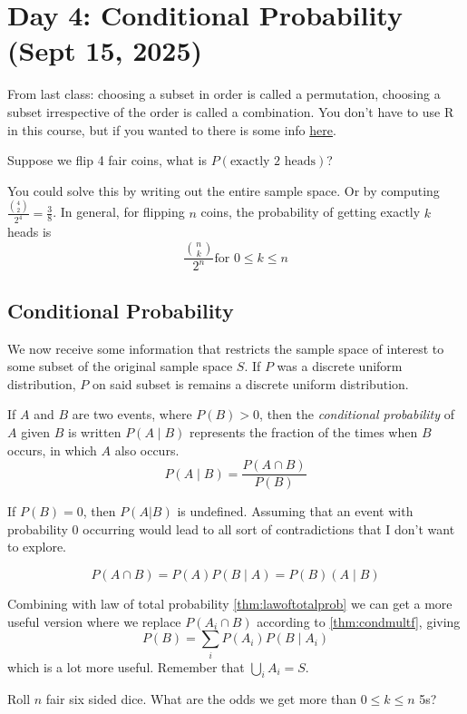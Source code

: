 \section{Day 4: Conditional Probability (Sept 15, 2025)}

From last class: choosing a subset in order is called a permutation, choosing a subset irrespective of the order is called a combination. You don't have to use R in this course, but if you wanted to there is some info \href{http://probability.ca/Rinfo.html}{here}.

\begin{problem}
    Suppose we flip 4 fair coins, what is $P(\text{exactly 2 heads})$?
\end{problem}

\noindent You could solve this by writing out the entire sample space. Or by computing $\frac{\binom{4}{2}}{2^4} = \frac{3}{8}$. In general, for flipping $n$ coins, the probability of getting exactly $k$ heads is
\[
\frac{\binom{n}{k}}{2^n} \text{for $0 \leq k \leq n$}
\]

\subsection{Conditional Probability}

We now receive some information that restricts the sample space of interest to some subset of the original sample space $S$. If $P$ was a discrete uniform distribution, $P$ on said subset is remains a discrete uniform distribution. 

\begin{definition}
    If $A$ and $B$ are two events, where $P(B) > 0$, then the \textit{conditional probability} of $A$ given $B$ is written $P(A \mid B)$  represents the fraction of the times when $B$ occurs, in which $A$ also occurs. 
\[
P(A \mid B) = \frac{P(A \cap B)}{P(B)}
\]
\end{definition}

If $P(B) = 0$, then $P(A | B)$ is undefined. Assuming that an event with probability 0 occurring would lead to all sort of contradictions that I don't want to explore.

\begin{simplethm} \label{thm:condmultf}
    \[P(A \cap B) = P(A)P(B \mid A) = P(B)(A \mid B)\]
\end{simplethm}

Combining with law of total probability \ref{thm:lawoftotalprob} we can get a more useful version where we replace $P(A_i \cap B)$ according to \ref{thm:condmultf}, giving
\[
P(B) = \sum_i P(A_i)P(B \mid A_i)
\]
which is a lot more useful. Remember that $\bigcup_i A_i = S$. 

\begin{problem}[Challenge]
Roll $n$ fair six sided dice. What are the odds we get more than $0 \leq k \leq n$ 5s? 
\end{problem}

